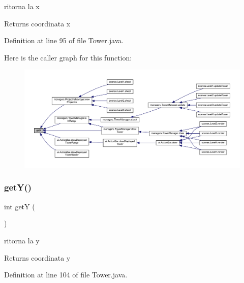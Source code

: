 ritorna la x 

\begin{DoxyReturn}{Returns}
coordinata x 
\end{DoxyReturn}


Definition at line 95 of file Tower.\+java.

Here is the caller graph for this function\+:
\nopagebreak
\begin{figure}[H]
\begin{center}
\leavevmode
\includegraphics[width=350pt]{classtowers_1_1_tower_ae13f88e922e1339355456062ad9fa359_icgraph}
\end{center}
\end{figure}
\mbox{\label{classtowers_1_1_tower_aab81944f0a14bba932c0931899951937}} 
\subsubsection{\texorpdfstring{get\+Y()}{getY()}}
{\footnotesize\ttfamily int getY (\begin{DoxyParamCaption}{ }\end{DoxyParamCaption})}



ritorna la y 

\begin{DoxyReturn}{Returns}
coordinata y 
\end{DoxyReturn}


Definition at line 104 of file Tower.\+java.

